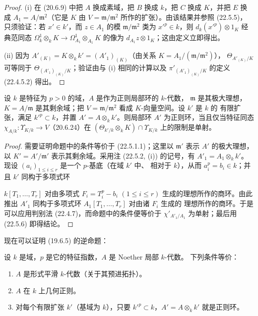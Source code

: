 \begin{proof}
(i) 在 (20.6.9) 中把 $A$ 换成素域，把 $B$ 换成 $k$，把 $C$ 换成
$K$，并把 $E$ 换成 $A_1=A/\mathfrak m^2$（它是 $K$ 由
$V=\mathfrak m/\mathfrak m^2$ 所作的扩张）。由该结果并参照 (22.5.5)，
只须验证：若 $x'\in k'$，而 $z\in A_1$ 的模
$\mathfrak m/\mathfrak m^2$ 类为 $x'^p\in k$，则
$d_k(x'^p)\otimes1_K$ 经典范同态
$\Omega^1_k\otimes_kK\longrightarrow\Omega^1_{A_1}\otimes_{A_1}K$
的像为 $d_{A_1}z\otimes1_K$；这由定义立即得出。

(ii) 因为 $A'_{(K)}=K\otimes_kk'=(A'_1)_{(K)}$（由关系
$K=A_1/(\mathfrak m/\mathfrak m^2)$），
$\Theta_{A'_{(K)}/K}$ 可等同于
$\Theta_{(A'_1)_{(K)}/K}$；验证由与 (i) 相同的计算以及
$\pi'_{(A'_1)_{(K)}/K}$ 的定义 (22.4.5.2) 得出。
\end{proof}

\begin{proposition}[22.5.7]
\label{0.22.5.7-fr}
设 $k$ 是特征为 $p>0$ 的域，$A$ 是作为正则局部环的 $k$-代数，
$\mathfrak m$ 是其极大理想，$K=A/\mathfrak m$ 是其剩余域；把
$V=\mathfrak m/\mathfrak m^2$ 看成 $K$-向量空间。设 $k'$ 是 $k$ 的
有限扩张，满足 $k'^p\subset k$，并置 $A'=A\otimes_kk'$。则局部环
$A'$ 为正则环，当且仅当特征同态
$\chi_{A/k}:\Upsilon_{K/k}\longrightarrow V$（20.6.24）在
$(\Theta_{k'/k}\otimes_kK)\cap\Upsilon_{K/k}$ 上的限制是单射。
\end{proposition}

\begin{proof}
需要证明命题中的条件等价于 (22.5.1.1)；这里以 $\mathfrak m'$ 表示
$A'$ 的极大理想，以 $K'=A'/\mathfrak m'$ 表示其剩余域。采用注
(22.5.2, (i)) 的记号，有 $A'_1=A_1\otimes_kk'$。现设
$(a_i)_{1\leqslant i\leqslant r}$ 是一个 $p$-基底（在域 $k'$ 中、
相对于 $k$），从而 $a_i^p=b_i\in k$；并且 $k'$ 同构于多项式环


$k[T_1,\ldots,T_r]$ 对由多项式 $F_i=T_i^p-b_i$
$(1\leqslant i\leqslant r)$ 生成的理想所作的商环。由此推出
$A'_1$ 同构于多项式环 $A_1[T_1,\ldots,T_r]$ 对由诸 $F_i$ 生成的
理想所作的商环。于是可以应用判别法 (22.4.7)，而命题中的条件便等价于
$\chi'_{A'_1/A_1}$ 为单射；最后用 (22.5.6) 即得结论。
\end{proof}

现在可以证明 (19.6.5) 的逆命题：

\begin{theorem}[22.5.8]
\label{0.22.5.8-fr}
设 $k$ 是域，$p$ 是它的特征指数，$A$ 是 Noether 局部 $k$-代数。
下列条件等价：
\begin{enumerate}
  \item[a)] $A$ 是形式平滑 $k$-代数（关于其预进拓扑）。
  \item[b)] $A$ 在 $k$ 上几何正则。
  \item[b')] 对每个有限扩张 $k'$（基域为 $k$），只要
  $k'^p\subset k$，$A'=A\otimes_kk'$ 就是正则环。
\end{enumerate}
\end{theorem}


